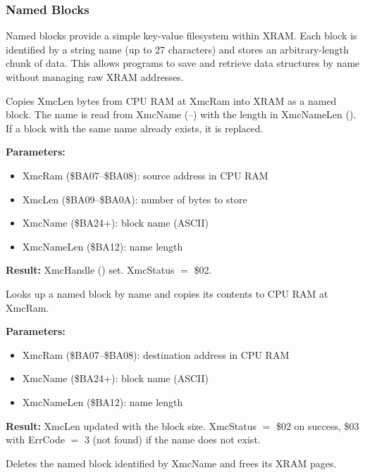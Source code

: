 \subsubsection{Named Blocks}

Named blocks provide a simple key-value filesystem within XRAM.  Each block
is identified by a string name (up to 27 characters) and stores an
arbitrary-length chunk of data.  This allows programs to save and retrieve
data structures by name without managing raw XRAM addresses.


Copies XmcLen bytes from CPU RAM at XmcRam into XRAM as a named block.
The name is read from XmcName (--) with the length
in XmcNameLen ().  If a block with the same name already exists,
it is replaced.

\textbf{Parameters:}
\begin{itemize}
  \item XmcRam (\$BA07--\$BA08): source address in CPU RAM
  \item XmcLen (\$BA09--\$BA0A): number of bytes to store
  \item XmcName (\$BA24+): block name (ASCII)
  \item XmcNameLen (\$BA12): name length
\end{itemize}

\textbf{Result:} XmcHandle () set.  XmcStatus $=$ \$02.

\medskip


Looks up a named block by name and copies its contents to CPU RAM at
XmcRam.

\textbf{Parameters:}
\begin{itemize}
  \item XmcRam (\$BA07--\$BA08): destination address in CPU RAM
  \item XmcName (\$BA24+): block name (ASCII)
  \item XmcNameLen (\$BA12): name length
\end{itemize}

\textbf{Result:} XmcLen updated with the block size.  XmcStatus $=$ \$02
on success, \$03 with ErrCode $=$ 3 (not found) if the name does not exist.

\medskip


Deletes the named block identified by XmcName and frees its XRAM pages.

